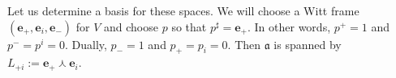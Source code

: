 \documentclass[11pt,reqno,a4paper,final]{amsart}
\theoremstyle{plain}
\theoremstyle{definition}
\newcommand{\fa}{\mathfrak{a}}
\newcommand{\be}{\boldsymbol{e}}
\newcommand{\Hrel}{\mathsf{H}_{\mathrm{rel}}}
\newcommand{\tr}{\operatorname{tr}}
\newcommand{\1}{\mathbb{1}}
\numberwithin{equation}{section}
\begin{document}
\begin{appendices}
Let us determine a basis for these spaces.  We will choose a Witt
frame $(\be_+,\be_i, \be_-)$ for $V$ and choose $p$ so that $p^\sharp
= \be_+$.  In other words, $p^+ = 1$ and $p^- = p^i = 0$.  Dually,
$p_- = 1$ and $p_+ = p_i = 0$.  Then $\fa$ is spanned by $L_{+i} :=
\be_+ \curlywedge \be_i$.



\end{appendices}
\end{document}

